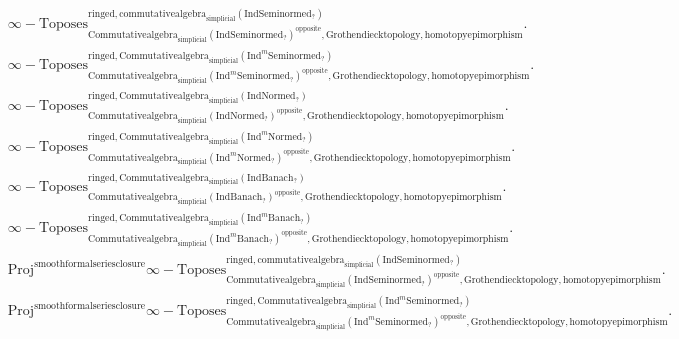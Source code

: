 \documentclass[11pt]{book}
\theoremstyle{definition}
\numberwithin{equation}{section}
\begin{document}
\begin{align}
&\infty-\mathrm{Toposes}^{\mathrm{ringed},\mathrm{commutativealgebra}_{\mathrm{simplicial}}(\mathrm{Ind}\mathrm{Seminormed}_?)}_{\mathrm{Commutativealgebra}_{\mathrm{simplicial}}(\mathrm{Ind}\mathrm{Seminormed}_?)^\mathrm{opposite},\mathrm{Grothendiecktopology,homotopyepimorphism}}.\\
&\infty-\mathrm{Toposes}^{\mathrm{ringed},\mathrm{Commutativealgebra}_{\mathrm{simplicial}}(\mathrm{Ind}^m\mathrm{Seminormed}_?)}_{\mathrm{Commutativealgebra}_{\mathrm{simplicial}}(\mathrm{Ind}^m\mathrm{Seminormed}_?)^\mathrm{opposite},\mathrm{Grothendiecktopology,homotopyepimorphism}}.\\
&\infty-\mathrm{Toposes}^{\mathrm{ringed},\mathrm{Commutativealgebra}_{\mathrm{simplicial}}(\mathrm{Ind}\mathrm{Normed}_?)}_{\mathrm{Commutativealgebra}_{\mathrm{simplicial}}(\mathrm{Ind}\mathrm{Normed}_?)^\mathrm{opposite},\mathrm{Grothendiecktopology,homotopyepimorphism}}.\\
&\infty-\mathrm{Toposes}^{\mathrm{ringed},\mathrm{Commutativealgebra}_{\mathrm{simplicial}}(\mathrm{Ind}^m\mathrm{Normed}_?)}_{\mathrm{Commutativealgebra}_{\mathrm{simplicial}}(\mathrm{Ind}^m\mathrm{Normed}_?)^\mathrm{opposite},\mathrm{Grothendiecktopology,homotopyepimorphism}}.\\
&\infty-\mathrm{Toposes}^{\mathrm{ringed},\mathrm{Commutativealgebra}_{\mathrm{simplicial}}(\mathrm{Ind}\mathrm{Banach}_?)}_{\mathrm{Commutativealgebra}_{\mathrm{simplicial}}(\mathrm{Ind}\mathrm{Banach}_?)^\mathrm{opposite},\mathrm{Grothendiecktopology,homotopyepimorphism}}.\\
&\infty-\mathrm{Toposes}^{\mathrm{ringed},\mathrm{Commutativealgebra}_{\mathrm{simplicial}}(\mathrm{Ind}^m\mathrm{Banach}_?)}_{\mathrm{Commutativealgebra}_{\mathrm{simplicial}}(\mathrm{Ind}^m\mathrm{Banach}_?)^\mathrm{opposite},\mathrm{Grothendiecktopology,homotopyepimorphism}}.\\ 
&\mathrm{Proj}^\text{smoothformalseriesclosure}\infty-\mathrm{Toposes}^{\mathrm{ringed},\mathrm{commutativealgebra}_{\mathrm{simplicial}}(\mathrm{Ind}\mathrm{Seminormed}_?)}_{\mathrm{Commutativealgebra}_{\mathrm{simplicial}}(\mathrm{Ind}\mathrm{Seminormed}_?)^\mathrm{opposite},\mathrm{Grothendiecktopology,homotopyepimorphism}}. \\
&\mathrm{Proj}^\text{smoothformalseriesclosure}\infty-\mathrm{Toposes}^{\mathrm{ringed},\mathrm{Commutativealgebra}_{\mathrm{simplicial}}(\mathrm{Ind}^m\mathrm{Seminormed}_?)}_{\mathrm{Commutativealgebra}_{\mathrm{simplicial}}(\mathrm{Ind}^m\mathrm{Seminormed}_?)^\mathrm{opposite},\mathrm{Grothendiecktopology,homotopyepimorphism}}.\\

\end{align}
\end{document}

